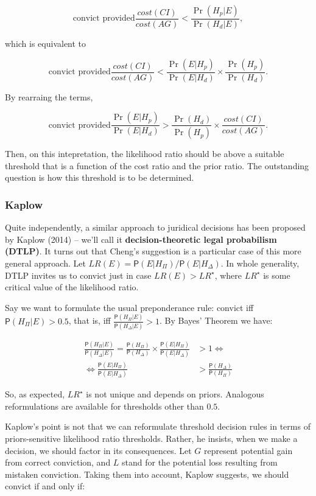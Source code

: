 \documentclass[10pt,dvipsnames,enabledeprecatedfontcommands]{scrartcl}
\newcommand{\pr}[1]{\mathsf{P}(#1)}
\begin{document}
\[ \text{convict provided}           \frac{cost(CI)}{cost(AG)} < \frac{\Pr(H_p | E)}{\Pr(H_d | E )}, \]

which is equivalent to

\[ \text{convict provided}           \frac{cost(CI)}{cost(AG)} < \frac{\Pr(E | H_p)}{\Pr(E | H_d)} \times \frac{\Pr(H_p)}{\Pr(H_d)}.\]

By rearraing the terms,

\[ \text{convict provided}  \frac{\Pr(E | H_p)}{\Pr(E | H_d)} > \frac{\Pr(H_d)}{\Pr(H_p)} \times     \frac{cost(CI)}{cost(AG)} .\]

Then, on this intepretation, the likelihood ratio should be above a
suitable threshold that is a function of the cost ratio and the prior
ratio. The outstanding question is how this threshold is to be
determined.

\subsubsection{Kaplow}\label{kaplow}

Quite independently, a similar approach to juridical decisions has been
proposed by Kaplow (2014) -- we'll call it
\textbf{decision-theoretic legal probabilism (DTLP)}. It turns out that
Cheng's suggestion is a particular case of this more general approach.
Let \(LR(E)=\pr{E\vert H_\Pi}/\pr{E\vert H_\Delta}\). In whole
generality, DTLP invites us to convict just in case \(LR(E)>LR^\star\),
where \(LR^\star\) is some critical value of the likelihood ratio.

Say we want to formulate the usual preponderance rule: convict iff
\(\pr{H_\Pi\vert E}>0.5\), that is, iff
\(\frac{\pr{H_\Pi\vert E}}{\pr{H_\Delta\vert E}}>1\). By Bayes' Theorem
we have:

\vspace{-6mm}

\begin{align*}
\frac{\pr{H_\Pi\vert E}}{\pr{H_\Delta\vert E}} =  \frac{\pr{H_\Pi}}{\pr{H_\Delta}}\times \frac{\pr{E\vert H_\Pi}}{\pr{E\vert H_\Delta}} &>1 \Leftrightarrow\\
  \Leftrightarrow \frac{\pr{E\vert H_\Pi}}{\pr{E\vert H_\Delta}} &> \frac{\pr{H_\Delta}}{\pr{H_\Pi}} 
 \end{align*}

\noindent So, as expected, \(LR^\star\) is not unique and depends on
priors. Analogous reformulations are available for thresholds other than
\(0.5\).

Kaplow's point is not that we can reformulate threshold decision rules
in terms of priors-sensitive likelihood ratio thresholds. Rather, he
insists, when we make a decision, we should factor in its consequences.
Let \(G\) represent potential gain from correct conviction, and \(L\)
stand for the potential loss resulting from mistaken conviction. Taking
them into account, Kaplow suggests, we should convict if and only if:
\end{document}
